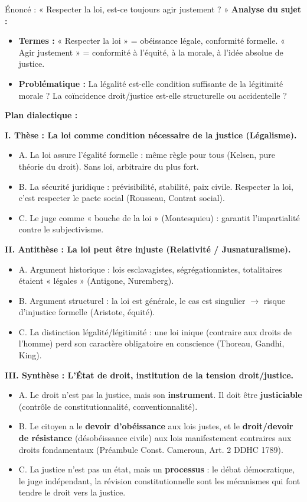 \documentclass[11pt]{article}
\begin{document}
\begin{exoresolu}Énoncé : « Respecter la loi, est-ce toujours agir justement ? »\tcblower
\textbf{Analyse du sujet :}
\begin{itemize}
    \item \textbf{Termes :} « Respecter la loi » = obéissance légale, conformité formelle. « Agir justement » = conformité à l'équité, à la morale, à l'idée absolue de justice.
    \item \textbf{Problématique :} La légalité est-elle condition suffisante de la légitimité morale ? La coïncidence droit/justice est-elle structurelle ou accidentelle ?
\end{itemize}

\textbf{Plan dialectique :}

\textbf{I. Thèse : La loi comme condition nécessaire de la justice (Légalisme).}
\begin{itemize}
    \item A. La loi assure l'égalité formelle : même règle pour tous (Kelsen, pure théorie du droit). Sans loi, arbitraire du plus fort.
    \item B. La sécurité juridique : prévisibilité, stabilité, paix civile. Respecter la loi, c'est respecter le pacte social (Rousseau, Contrat social).
    \item C. Le juge comme « bouche de la loi » (Montesquieu) : garantit l'impartialité contre le subjectivisme.
\end{itemize}

\textbf{II. Antithèse : La loi peut être injuste (Relativité / Jusnaturalisme).}
\begin{itemize}
    \item A. Argument historique : lois esclavagistes, ségrégationnistes, totalitaires étaient « légales » (Antigone, Nuremberg).
    \item B. Argument structurel : la loi est générale, le cas est singulier $\to$ risque d'injustice formelle (Aristote, équité).
    \item C. La distinction légalité/légitimité : une loi inique (contraire aux droits de l'homme) perd son caractère obligatoire en conscience (Thoreau, Gandhi, King).
\end{itemize}

\textbf{III. Synthèse : L'État de droit, institution de la tension droit/justice.}
\begin{itemize}
    \item A. Le droit n'est pas la justice, mais son \textbf{instrument}. Il doit être \textbf{justiciable} (contrôle de constitutionnalité, conventionnalité).
    \item B. Le citoyen a le \textbf{devoir d'obéissance} aux lois justes, et le \textbf{droit/devoir de résistance} (désobéissance civile) aux lois manifestement contraires aux droits fondamentaux (Préambule Const. Cameroun, Art. 2 DDHC 1789).
    \item C. La justice n'est pas un état, mais un \textbf{processus} : le débat démocratique, le juge indépendant, la révision constitutionnelle sont les mécanismes qui font tendre le droit vers la justice.
\end{itemize}


\end{exoresolu}
\end{document}
